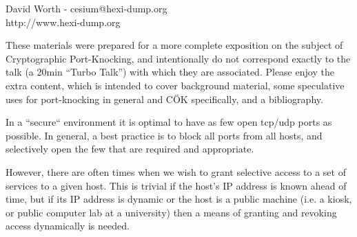 \documentclass[landscape,twocolumn,headrule]{foils}
\begin{document}
\LogoOff %




David Worth - cesium@hexi-dump.org\\
http://www.hexi-dump.org


\LogoOn
\raggedright
\small

These materials were prepared for a more complete exposition on the subject of Cryptographic Port-Knocking, and intentionally do not correspond exactly to the talk (a 20min ``Turbo Talk'') with which they are associated.  Please enjoy the extra content, which is intended to cover background material, some speculative uses for port-knocking in general and C\"{O}K specifically, and a bibliography.

In a ``secure`` environment it is optimal to have as few open tcp/udp ports as possible.  In general, a best practice is to block all ports from all hosts, and selectively open the few that are required and appropriate.

However, there are often times when we wish to grant selective access to a set of services to a given host.  This is trivial if the host's IP address is known ahead of time, but if its IP address is dynamic or the host is a public machine (i.e. a kiosk, or public computer lab at a university) then a means of granting and revoking access dynamically is needed.
\end{document}
